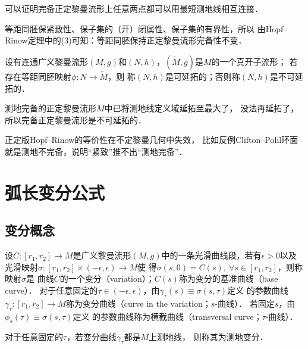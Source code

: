 可以证明\cite[\S 3.6]{chen-li-2023-2ed-v1}完备正定黎曼流形上任意两点都可以用最短测地线相互连接．

等距同胚保紧致性、保子集的（开）闭属性、保子集的有界性，所以
由Hopf--Rinow定理中的(3)可知：等距同胚保持正定黎曼流形完备性不变．

\begin{definition}\label{chgd:def_extensible}
    设有连通广义黎曼流形$(M,g)$和$(N,h)$，$(\widetilde{M},g)$是$M$的一个真开子流形；
    若存在等距同胚映射$\phi:N\to \widetilde{M}$，则
    称$(N,h)$是{\heiti 可延拓的}；否则称$(N,h)$是{\heiti 不可延拓的}．
\end{definition}

测地完备的正定黎曼流形$M$中已将测地线定义域延拓至最大了，
没法再延拓了，所以完备正定黎曼流形是不可延拓的．



正定版Hopf--Rinow的等价性在不定黎曼几何中失效，
比如反例Clifton--Pohl环面就是测地不完备，说明“紧致”推不出“测地完备”．

\section{弧长变分公式}


\subsection{变分概念}\label{chgd:sec_arc-variation}
\begin{definition}\label{chgd:def_arc-variation}
    设$C:[r_1,r_2]\to M$是广义黎曼流形$(M,g)$中的一条光滑曲线段，若有$\epsilon > 0$以及
    光滑映射$\sigma:[r_1,r_2]\times (-\epsilon, \epsilon) \to M$使
    得$\sigma(s,0)=C(s),\ \forall s\in [r_1,r_2]$，则称映射$\sigma$是
    曲线$C$的一个{\heiti 变分}（variation）；$C(s)$称为变分的{\heiti 基准曲线}（base curve）．
    对于任意固定的$\tau \in(-\epsilon, \epsilon) $，由$\gamma_\tau(s)\equiv \sigma(s,\tau)$定义
    的参数曲线$\gamma_\tau : [r_1,r_2]\to M$称为{\heiti 变分曲线}（curve in the variation；$s$-曲线）．
    若固定$s$，由$\phi_s(\tau)\equiv \sigma(s,\tau)$定义
    的参数曲线称为{\heiti 横截曲线}（transversal curve；$\tau$-曲线）．
\end{definition}

对于任意固定的$\tau$，若变分曲线$\gamma_\tau$都是$M$上测地线，
则称其为{\heiti 测地变分}． 

